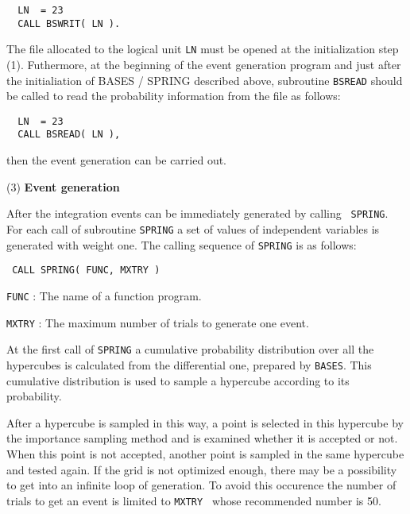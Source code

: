 \par
{\small\begin{verbatim}
  LN  = 23
  CALL BSWRIT( LN ).
\end{verbatim}} 
The file allocated to the logical unit {\tt LN} must be opened at the
initialization step (1).
Futhermore, at the beginning of the event generation program and
just after the initialiation of BASES / SPRING described above, subroutine
{\tt BSREAD} should be called to read the probability information from
the file as follows:
\par
{\small\begin{verbatim}
  LN  = 23
  CALL BSREAD( LN ),
\end{verbatim}}
\par\noindent
then the event generation can be carried out. 
\par\medskip 
\noindent  
(3) {\bf Event generation} 
\par\smallskip
After the integration events can be immediately generated by calling {\tt
SPRING}. 
For each call of subroutine {\tt SPRING} a set of values of independent
variables is generated with weight one.
The calling sequence of {\tt SPRING} is as follows:
\par
{\small
\begin{verbatim}
 CALL SPRING( FUNC, MXTRY )
\end{verbatim}}
\par
{\small
\begin{description}
\item{\tt FUNC} : The name of a function program.
\item{\tt MXTRY} : The maximum number of trials to generate one event.
\end{description}}
\par\noindent
At the first call of {\tt SPRING} a cumulative
probability distribution over all the hypercubes is calculated from the
differential one, prepared by {\tt BASES}.
This cumulative distribution is used to sample a hypercube according to
its probability. 
\par
After a hypercube is sampled in this way, a point is selected in this hypercube by
the importance sampling method and is examined whether it is accepted or not. 
When this point is not accepted, another point is sampled in the same hypercube
and tested again.
If the grid is not optimized enough, there may be a possibility to get into
an infinite loop of generation.
To avoid this occurence the number of trials to get an event is limited to
{\tt MXTRY } whose recommended number is 50.

